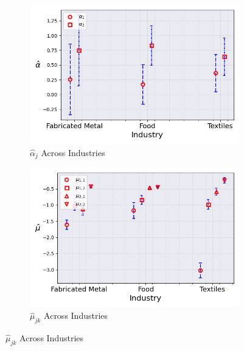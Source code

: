 \documentclass{article}
\begin{document}
\begin{figure}[ht!]
    \centering 
    \caption{I.I.D Mixture Model Across Industries ($M_0 = 2$)}
    \begin{subfigure}[t]{0.32\textwidth}
        \centering
        \includegraphics[width=\textwidth]{figure/stationary_mixture_alpha_across_industries_m2.png}
        \caption{$\hat\alpha_j$ Across Industries}
    \end{subfigure}
    \begin{subfigure}[t]{0.32\textwidth}
        \centering
        \includegraphics[width=\textwidth]{figure/stationary_mixture_mu_across_industries_m2.png}
        \caption{$\hat\mu_{jk}$ Across Industries}
    \end{subfigure}


\end{figure}
\end{document}
